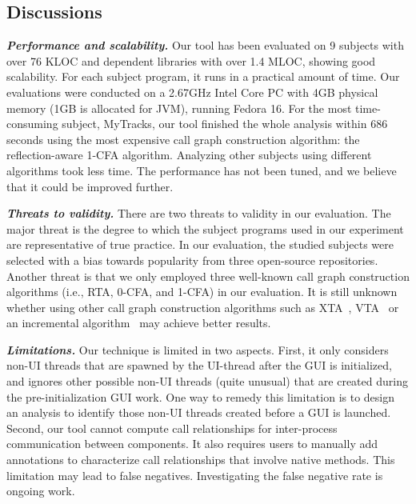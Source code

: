\subsection{Discussions}

\noindent \textbf{\textit{Performance and scalability.}} Our tool
has been evaluated on 9 subjects with over 76 KLOC and dependent
libraries with over 1.4 MLOC, showing good scalability.
For each subject program, it runs in a practical amount of time. Our evaluations
were conducted on a 2.67GHz Intel Core PC with 4GB
physical memory (1GB is allocated for JVM), running Fedora 16.
For the most time-consuming subject, MyTracks, our tool finished the whole analysis
within 686 seconds using the most expensive call graph construction
algorithm: the reflection-aware 1-CFA algorithm. Analyzing
other subjects using different algorithms took less time.
The performance has not been tuned, and we believe
that it could be improved further.



\vspace{1mm}

\noindent \textbf{\textit{Threats to validity.}}
There are two threats to validity in our evaluation. 
The major threat is the degree to which the subject programs
used in our experiment are representative of true practice.
In our evaluation, the studied subjects were selected with a bias towards popularity from
three open-source repositories. Another threat is that we only employed three
well-known call graph construction algorithms (i.e., RTA, 0-CFA, and 1-CFA) 
in our evaluation. It is still unknown whether using other 
call graph construction algorithms such as XTA~\cite{xta}, VTA~\cite{Sundaresan:2000} or
an incremental algorithm~\cite{inccg} may achieve better results.


\vspace{1mm}

\noindent \textbf{\textit{Limitations.}}
Our technique is limited in two aspects. First, it only considers
non-UI threads that are spawned by the UI-thread after the GUI
is initialized, and ignores other possible non-UI threads (quite unusual)
that are created during the pre-initialization GUI work. One way
to remedy this limitation is to design an analysis to identify
those non-UI threads created before a GUI is launched.
Second, our tool cannot compute call relationships
for inter-process communication between components. It also
requires users to manually add annotations to characterize
call relationships that involve native methods. This limitation
may lead to false negatives. Investigating the false negative
rate is ongoing work.


